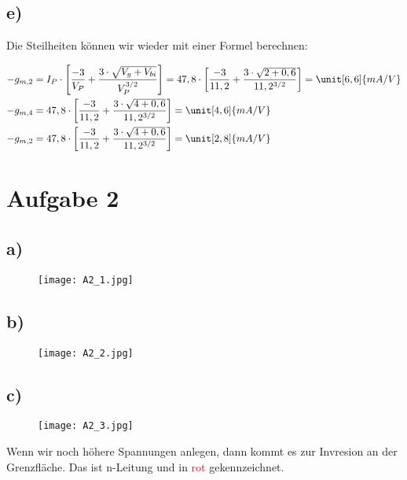 \subsection*{e)}

Die Steilheiten können wir wieder mit einer Formel berechnen:

\begin{align*}
-g_{m,2} &= I_P \cdot \left[ \frac{-3}{V_P} + \frac{3 \cdot \sqrt{V_g + V_{bi}}}{V_P^{3/2}} \right] = 47,8 \cdot \left[ \frac{-3}{11,2} + \frac{3 \cdot \sqrt{2 + 0,6}}{11,2^{3/2}} \right] = \unit[6,6]{mA/V} \\
-g_{m,4} &= 47,8 \cdot \left[ \frac{-3}{11,2} + \frac{3 \cdot \sqrt{4 + 0,6}}{11,2^{3/2}} \right] = \unit[4,6]{mA/V} \\
-g_{m,2} &=  47,8 \cdot \left[ \frac{-3}{11,2} + \frac{3 \cdot \sqrt{4 + 0,6}}{11,2^{3/2}} \right] = \unit[2,8]{mA/V}
\end{align*}


\newpage

\section{Aufgabe 2}

\subsection*{a)}

\begin{figure}[h]
	\centering
	\texttt{[image: A2\_1.jpg]}
\end{figure}


\subsection*{b)}

\begin{figure}[h]
	\centering
	\texttt{[image: A2\_2.jpg]}
\end{figure}


\newpage

\subsection*{c)}

\begin{figure}[h]
	\centering
	\texttt{[image: A2\_3.jpg]}
\end{figure}

Wenn wir noch höhere Spannungen anlegen, dann kommt es zur Invresion an der Grenzfläche. Das ist n-Leitung und in \textcolor{red}{rot} gekennzeichnet.



